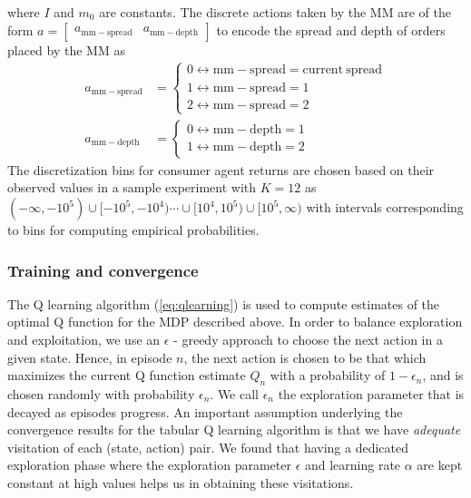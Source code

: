 \documentclass[sigconf]{acmart}
\begin{document}
where $I$ and $m_0$ are constants. The discrete actions taken by the MM are of the form $a=\begin{bmatrix}a_\mathrm{mm-spread}&a_\mathrm{mm-depth}\end{bmatrix}$ to encode the spread and depth of orders placed by the MM as\begin{align*}
    a_{\mathrm{mm-spread}}&=\begin{cases}
    0\leftrightarrow\mathrm{mm-spread}=\mathrm{current\ spread}\\
    1\leftrightarrow\mathrm{mm-spread}=1\\
    2\leftrightarrow\mathrm{mm-spread}=2
    \end{cases}\\
    a_{\mathrm{mm-depth}}&=\begin{cases}
    0\leftrightarrow\mathrm{mm-depth}=1\\
    1\leftrightarrow\mathrm{mm-depth}=2
    \end{cases}
\end{align*}
The discretization bins for consumer agent returns are chosen based on their observed values in a sample experiment with $K=12$ as $(-\infty,-10^{5})\cup[-10^5,-10^4)\cdots\cup[10^4,10^5)\cup[10^5,\infty)$ with intervals corresponding to bins for computing empirical probabilities. 
\subsubsection{Training and convergence}
The Q learning algorithm (\ref{eq:qlearning}) is used to compute estimates of the optimal Q function for the MDP described above. In order to balance exploration and exploitation, we use an $\epsilon$ - greedy approach to choose the next action in a given state. Hence, in episode $n$, the next action is chosen to be that which maximizes the current Q function estimate $Q_n$ with a probability of $1-\epsilon_n$, and is chosen randomly with probability $\epsilon_n$. We call $\epsilon_n$ the exploration parameter that is decayed as episodes progress. An important assumption underlying the convergence results for the tabular Q learning algorithm is that we have \textit{adequate} visitation of each (state, action) pair. We found that having a dedicated exploration phase where the exploration parameter $\epsilon$ and learning rate $\alpha$ are kept constant at high values helps us in obtaining these visitations. 
\end{document}
